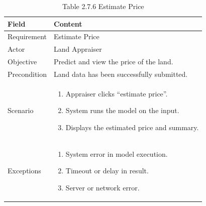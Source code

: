 \documentclass[12pt,oneside]{report}
\begin{document}
\begin{table}[H]
\centering
\caption{Table 2.7.6 Estimate Price}
\label{tab:req-estimate-price}
\begin{tabularx}{\textwidth}{|p{3cm}|X|}
\hline
\textbf{Field} & \textbf{Content} \\ \hline

Requirement & Estimate Price \\ \hline

Actor & Land Appraiser \\ \hline

Objective & Predict and view the price of the land. \\ \hline

Precondition & Land data has been successfully submitted. \\ \hline

Scenario & 
\begin{minipage}[t]{0.75\textwidth}
\begin{enumerate}[leftmargin=*,label=\arabic*.]
\item Appraiser clicks “estimate price”.
\item System runs the model on the input.
\item Displays the estimated price and summary.
\end{enumerate}
\end{minipage} \\ \hline

Exceptions & 
\begin{minipage}[t]{0.75\textwidth}
\begin{enumerate}[leftmargin=*,label=\arabic*.]
\item System error in model execution.
\item Timeout or delay in result.
\item Server or network error.
\end{enumerate}
\end{minipage} \\ \hline
\end{tabularx}
\end{table}
\end{document}
